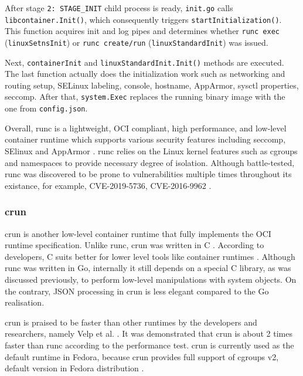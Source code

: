 After stage \texttt{2: STAGE\_INIT} child process is ready, \texttt{init.go} calls \texttt{libcontainer.Init()}, which consequently triggers \texttt{startInitialization()}. This function acquires init and log pipes and determines whether \texttt{runc exec} (\texttt{linuxSetnsInit}) or \texttt{runc create/run} (\texttt{linuxStandardInit}) was issued.

Next, \texttt{containerInit} and \texttt{linuxStandardInit.Init()} methods are executed. The last function actually does the initialization work such as networking and routing setup, SELinux labeling, console, hostname, AppArmor, sysctl properties, seccomp. After that, \texttt{system.Exec} replaces the running binary image with the one from \texttt{config.json}.

Overall, runc is a lightweight, OCI compliant, high performance, and low-level container runtime which supports various security features including seccomp, SElinux and AppArmor \cite{c:5}. runc relies on the Linux kernel features such as cgroups and namespaces to provide necessary degree of isolation. Although battle-tested, runc was discovered to be prone to vulnerabilities multiple times throughout its existance, for example, CVE-2019-5736, CVE-2016-9962 \cite{s:unit42} \cite{s:rh1}.

\subsubsection*{crun}

crun is another low-level container runtime that fully implements the OCI runtime specification. Unlike runc, crun was written in C \cite{d:implementations}. According to developers, C suits better for lower level tools like container runtimes \cite{gh:crun}. Although runc was written in Go, internally it still depends on a special C library, as was discussed previously, to perform low-level manipulations with system objects. On the contrary, JSON processing in crun is less elegant compared to the Go realisation.

crun is praised to be faster than other runtimes by the developers and researchers, namely Velp et al. \cite{c:6}. It was demonstrated that crun is about 2 times faster than runc according to the performance test. crun is currently used as the default runtime in Fedora, because crun provides full support of cgroups v2, default version in Fedora distribution \cite{c:7}.

